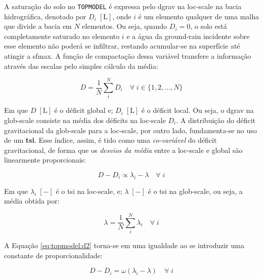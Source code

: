 \documentclass[./main.tex]{subfiles}
\begin{document}
\par A saturação do solo no \texttt{TOPMODEL} é expressa pelo \gls{dgrav} na \gls{loc-scale} na bacia hidrográfica, denotado por $D_{i} \; [\text{L}]$, onde $i$ é um elemento qualquer de uma malha que divide a bacia em $N$ elementos. Ou seja, quando $D_{i} = 0$, o solo está completamente saturado no elemento $i$ e a água da \gls{ground-rain} incidente sobre esse elemento não poderá se infiltrar, restando acumular-se na superfície até atingir a \gls{sfmax}. A função de compactação dessa variável transfere a informação através das escalas pelo simples cálculo da média:
\begin{linenomath*}
\begin{equation}
\label{eq:topmodel:d1}
D = \frac{1}{N} \sum^{N}_{i} D_{i} \quad  \forall \; i \in \{ 1, 2, ..., N\}
\end{equation}
\end{linenomath*}
Em que $D \; [\text{L}]$ é o déficit global e; $D_{i} \; [\text{L}]$ é o déficit local. Ou seja, o \gls{dgrav} na \gls{glob-scale} consiste na média dos déficits na \gls{loc-scale} $D_{i}$. A distribuição do déficit gravitacional da \gls{glob-scale} para a \gls{loc-scale}, por outro lado, fundamenta-se no uso de um \textbf{\gls{tsi}}. Esse índice, assim, é tido como uma \textit{co-variável} do déficit gravitacional, de forma que os \textit{desvios da média} entre a \gls{loc-scale} e global são linearmente proporcionais:
\begin{linenomath*}
\begin{equation}
\label{eq:topmodel:d2}
D - D_{i}  \propto \lambda_{i} - \lambda  \quad \forall \; i
\end{equation}
\end{linenomath*}
Em que $\lambda_{i}\; [-]$ é o \gls{tsi} na \gls{loc-scale}, e; $\lambda \; [-]$ é o \gls{tsi} na \gls{glob-scale}, ou seja, a média obtida por:
\begin{linenomath*}
\begin{equation}
\label{eq:topmodel:d3}
\lambda = \frac{1}{N} \sum^{N}_{i} \lambda_{i} \quad  \forall \; i 
\end{equation}
\end{linenomath*}
A Equação \eqref{eq:topmodel:d2} torna-se em uma igualdade ao se introduzir uma constante de proporcionalidade:
\begin{linenomath*}
\begin{equation}
\label{eq:topmodel:d4}
D - D_{i}  = \omega (\lambda_{i} - \lambda ) \quad \forall \; i
\end{equation}
\end{linenomath*}
\end{document}
